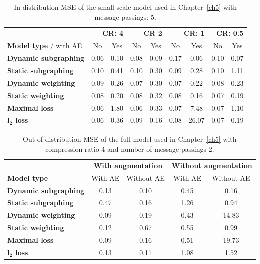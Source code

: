 \documentclass[12pt,a4paper]{report}
\begin{document}
\begin{appendices}
\begin{table}[H]
\centering
\caption{In-distribution MSE of the small-scale model used in Chapter~\ref{ch5} with message passings: 5.}
\label{table_in_distribution_5}
\begin{tabular}{lcccccccc}
\toprule
 & \multicolumn{2}{r}{\textbf{CR: 4}} & \multicolumn{2}{r}{\textbf{CR 2}} & \multicolumn{2}{r}{\textbf{CR: 1}} & \multicolumn{2}{r}{\textbf{CR: 0.5}} \\
 \cmidrule{2-9}
\textbf{Model type} / with AE & No & Yes & No & Yes & No & Yes & No & Yes \\
\midrule
\textbf{Dynamic subgraphing} & 0.06 & 0.10 & 0.08 & 0.09 & 0.17 & 0.06 & 0.10 & 0.07 \\
\textbf{Static subgraphing} & 0.10 & 0.41 & 0.10 & 0.30 & 0.09 & 0.28 & 0.10 & 1.11 \\
\textbf{Dynamic weighting} & 0.09 & 0.26 & 0.07 & 0.30 & 0.07 & 0.22 & 0.08 & 0.23 \\
\textbf{Static weighting} & 0.08 & 0.20 & 0.08 & 0.32 & 0.08 & 0.16 & 0.07 & 0.19 \\
\textbf{Maximal loss} & 0.06 & 1.80 & 0.06 & 0.33 & 0.07 & 7.48 & 0.07 & 1.10 \\
\textbf{$\boldsymbol{l_2}$ loss} & 0.06 & 0.36 & 0.09 & 0.16 & 0.08 & 26.07 & 0.07 & 0.19 \\
\bottomrule
\end{tabular}
\end{table}

\begin{table}
\centering
\caption{Out-of-distribution MSE of the full model used in Chapter~\ref{ch5} with compression ratio 4 and number of message passings 2.}
\label{table_4_2}
\begin{tabular}{lcccc}
\toprule
 & \multicolumn{2}{c}{\textbf{With augmentation}} & \multicolumn{2}{c}{\textbf{Without augmentation}} \\
 \cmidrule{2-3} \cmidrule{4-5}
\textbf{Model type} & With AE & Without AE & With AE & Without AE \\
\midrule
\textbf{Dynamic subgraphing} & 0.13 & 0.10 & 0.45 & 0.16 \\
\textbf{Static subgraphing} & 0.47 & 0.16 & 1.26 & 0.94 \\
\textbf{Dynamic weighting} & 0.09 & 0.19 & 0.43 & 14.83 \\
\textbf{Static weighting} & 0.12 & 0.67 & 0.55 & 0.99 \\
\textbf{Maximal loss} & 0.09 & 0.16 & 0.51 & 19.73 \\
\textbf{$\boldsymbol{l_2}$ loss} & 0.13 & 0.11 & 1.08 & 1.52 \\
\bottomrule
\end{tabular}
\end{table}


\end{appendices}
\end{document}
